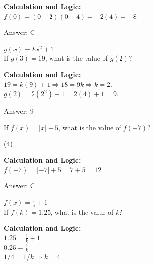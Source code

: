 \documentclass[11pt,paper=a4,answers]{exam}
\begin{document}
\begin{questions}
\begin{solution}
\vspace{30pt}

\textbf{Calculation and Logic:} \\
$f(0) = (0-2)(0+4) = -2(4) = -8$

\vspace{30pt}

Answer: \colorbox{yellow!100}{C}
\end{solution}

\vspace{40pt}

\question
$g(x) = kx^2 + 1$ \\
If $g(3) = 19$, what is the value of $g(2)$?

\begin{solution}
\textbf{Calculation and Logic:} \\
$19 = k(9) + 1 \Rightarrow 18 = 9k \Rightarrow k = 2$. \\
$g(2) = 2(2^2) + 1 = 2(4) + 1 = 9$.

\vspace{30pt}

Answer: \colorbox{yellow!100}{9}
\end{solution}

\vspace{40pt}

\question
If $f(x) = |x| + 5$, what is the value of $f(-7)$?
\begin{tasks}(4)
\end{tasks}

\begin{solution}
\textbf{Calculation and Logic:} \\
$f(-7) = |-7| + 5 = 7 + 5 = 12$

\vspace{30pt}

Answer: \colorbox{yellow!100}{C}
\end{solution}

\vspace{40pt}

\question
$f(x) = \frac{1}{x} + 1$ \\
If $f(k) = 1.25$, what is the value of $k$?

\begin{solution}
\textbf{Calculation and Logic:} \\
$1.25 = \frac{1}{k} + 1$ \\
$0.25 = \frac{1}{k}$ \\
$1/4 = 1/k \Rightarrow k = 4$


\end{solution}
\end{questions}
\end{document}

